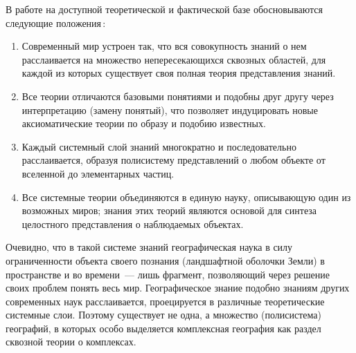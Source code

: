 \documentclass[14pt,draft,openany]{extbook}
\begin{document}
В работе на доступной теоретической и фактической базе обосновываются следующие положения\,:

\begin{enumerate}\bfseries\itemsep0pt 
\item Современный мир устроен так, что вся совокупность знаний о нем расслаивается на множество непересекающихся сквозных областей, для каждой из которых существует своя полная теория представления знаний.

\item Все теории отличаются базовыми понятиями и подобны друг другу через интерпретацию (замену понятый), что позволяет индуцировать новые аксиоматические теории по образу и подобию известных.

\item Каждый системный слой знаний многократно и последовательно расслаивается, образуя полисистему представлений о любом объекте от вселенной до элементарных частиц.

\item Все системные теории объединяются в единую науку, описывающую один из возможных миров; знания этих теорий являются основой для синтеза целостного представления о наблюдаемых объектах.
\end{enumerate}

Очевидно, что в такой системе знаний географическая наука в силу ограниченности объекта своего познания (ландшафтной оболочки Земли) в пространстве и во времени~--- лишь фрагмент, позволяющий через решение своих проблем понять весь мир. Географическое знание подобно знаниям других современных наук расслаивается, проецируется в различные теоретические системные слои.  Поэтому существует не одна, а множество (полисистема) географий, в которых особо выделяется комплексная география как раздел сквозной теории о комплексах.
\end{document}
